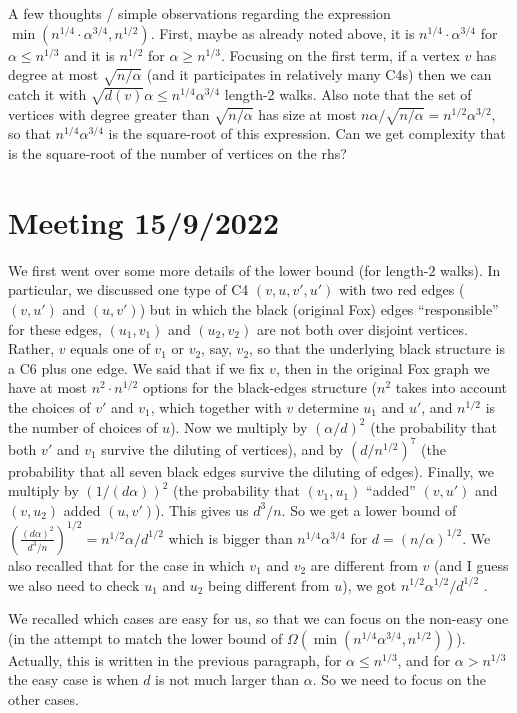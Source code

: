 \documentclass{article}
\begin{document}
A few thoughts / simple observations regarding the expression $\min(n^{1/4}\cdot\alpha^{3/4},n^{1/2})$. First, maybe as already noted above, it is $n^{1/4}\cdot\alpha^{3/4}$ for $\alpha \leq n^{1/3}$ and it is $n^{1/2}$ for $\alpha \geq n^{1/3}$. Focusing on the first term, if a vertex $v$ has degree at most $\sqrt{n/\alpha}$ (and it participates in relatively many C4s) then we can catch it with $\sqrt{d(v)}\alpha \leq n^{1/4}\alpha^{3/4}$ length-2 walks. Also note that the set of vertices with degree greater than $\sqrt{n/\alpha}$ has size at most $n\alpha/\sqrt{n/\alpha} = n^{1/2}\alpha^{3/2}$, so that $n^{1/4}\alpha^{3/4}$ is the square-root of this expression. Can we get complexity that is the square-root of the number of vertices on the rhs?

\newpage

\section{Meeting 15/9/2022}

We first went over some more details of the lower bound (for length-$2$ walks). In particular, we discussed one type of C4 $(v,u,v',u')$ with two red edges ($(v,u')$ and $(u,v')$) but in which the black (original Fox) edges ``responsible'' for these edges, $(u_1,v_1)$ and $(u_2,v_2)$ are not both over disjoint vertices. Rather, $v$ equals one of $v_1$ or $v_2$, say, $v_2$, so that the underlying black structure is a C6 plus one edge. We said that if we fix $v$, then in the original Fox graph we have at most $n^2 \cdot n^{1/2}$ options for the black-edges structure ($n^2$ takes into account the choices of $v'$ and $v_1$, which together with $v$ determine $u_1$ and $u'$, and $n^{1/2}$ is the number of choices of $u$). Now we multiply by $(\alpha/d)^2$ (the probability that both $v'$ and $v_1$ survive the diluting of vertices), and by $(d/n^{1/2})^7$ (the probability that all seven black edges survive the diluting of edges). Finally, we multiply by $(1/(d\alpha))^2$ (the probability that $(v_1,u_1)$ ``added'' $(v,u')$ and $(v,u_2)$ added $(u,v')$). This gives us $d^3/n$. So we get a lower bound of $\left(\frac{(d\alpha)^2}{d^3/n}\right)^{1/2} = n^{1/2}\alpha/d^{1/2}$ which is bigger than $n^{1/4}\alpha^{3/4}$ for $d = (n/\alpha)^{1/2}$.  We also recalled that for the case in which $v_1$ and $v_2$ are different from $v$ (and I guess we also need to check $u_1$ and $u_2$ being different from $u$), we got
$n^{1/2}\alpha^{1/2}/d^{1/2}$ .


We recalled which cases are easy for us, so that we can focus on the non-easy one (in the attempt to match the lower bound of $\Omega(\min(n^{1/4}\alpha^{3/4},n^{1/2}))$). Actually, this is written in the previous paragraph, for $\alpha \leq n^{1/3}$, and for $\alpha > n^{1/3}$ the easy case is when $d$ is not much larger than $\alpha$. So we need to focus on the other cases.
\end{document}
